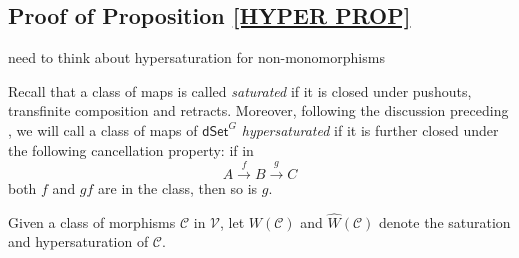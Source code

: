 \documentclass[a4paper,10pt,draft]{article}%
\begin{document}












\newpage

\subsection{Proof of Proposition \ref{HYPER PROP}}


{\color{red} need to think about hypersaturation for non-monomorphisms}

Recall that a class of maps is called \textit{saturated}
if it is closed under pushouts, transfinite composition and retracts.
Moreover, following the discussion preceding \cite[Prop. 3.6.8]{HHM16}, we will call a class of maps of $\mathsf{dSet}^G$ \textit{hypersaturated} if it is further closed under the following cancellation property: if in
\begin{equation}
      \label{CANCEL_EQ}
      A \xrightarrow{f} B \xrightarrow{g} C
\end{equation}
both $f$ and $gf$ are in the class, then so is $g$.

\begin{notation}
      Given a class of morphisms $\mathcal{C}$ in $\mathcal V$, let
      $W(\mathcal C)$ and $\hat{W}(\mathcal C)$ denote
      the saturation and hypersaturation of $\mathcal C$.
\end{notation}
\end{document}
